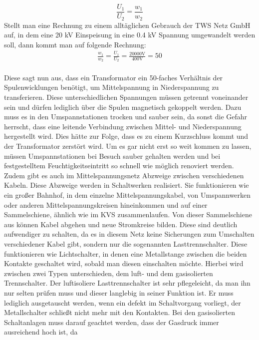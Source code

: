 \begin{equation}
\frac{U_1}{U_2}=\frac{w_1}{w_2}
\label{eqn:Transformator Wicklungszahl}
\end{equation}
Stellt man eine Rechnung zu einem alltäglichen Gebrauch der TWS Netz GmbH auf, in dem eine 20 kV Einspeisung in eine 0.4 kV Spannung umgewandelt werden 
soll, dann kommt man auf folgende Rechnung:
\begin{eqnarray}
\frac{w_1}{w_2}=\frac{U_1}{U_2}=\frac{20000\text{V}}{400\text{V}}=50
\label{eqn:Beispiel Wicklungen}
\end{eqnarray}
\\
Diese sagt nun aus, dass ein Transformator ein 50-faches Verhältnis der Spulenwicklungen benötigt, um Mittelspannung in Niederspannung zu transferieren. Diese 
unterschiedlichen Spannungen müssen getrennt voneinander sein und dürfen lediglich über die Spulen magnetisch gekoppelt werden. Dazu muss es in den 
Umspannstationen trocken und sauber sein, da sonst die Gefahr herrscht, dass eine leitende Verbindung zwischen Mittel- und Niederspannung hergestellt wird. 
Dies hätte zur Folge, dass es zu einem Kurzschluss kommt und der Transformator zerstört wird. Um es gar nicht erst so weit kommen zu lassen, müssen Umspannstationen 
bei Besuch sauber gehalten werden und bei festgestelltem Feuchtigkeitseintritt so schnell wie möglich renoviert werden. \autocite{Weigerber.2013} 
\\
Zudem gibt es auch im Mittelspannungsnetz Abzweige zwischen verschiedenen Kabeln. Diese Abzweige werden in Schaltwerken realisiert. Sie funktionieren wie ein 
großer Bahnhof, in dem einzelne Mittelspannungskabel, von \zB Umspannwerken oder anderen Mittelspannungskreisen hineinkommen und auf einer Sammelschiene, 
ähnlich wie im KVS zusammenlaufen. Von dieser Sammelschiene aus können Kabel abgehen und neue Stromkreise bilden. Diese sind deutlich aufwendiger zu schalten, 
da es in diesem Netz keine Sicherungen zum Umschalten verschiedener Kabel gibt, sondern nur die sogenannten Lasttrennschalter. Diese funktionieren wie 
Lichtschalter, in denen eine Metallstange zwischen die beiden Kontakte geschaltet wird, sobald man diesen einschalten möchte. Hierbei wird zwischen zwei 
Typen unterschieden, dem luft- und dem gasisolierten Trennschalter. 
Der luftisoliere Lasttrennschalter ist sehr pflegeleicht, da man ihn nur selten prüfen 
muss und dieser langlebig in seiner Funktion ist. Er muss lediglich ausgetauscht werden, wenn ein defekt im Schaltvorgang vorliegt, \zB der Metallschalter 
schließt nicht mehr mit den Kontakten. Bei den gasisolierten Schaltanlagen muss darauf geachtet werden, dass der Gasdruck immer ausreichend hoch ist, da 
